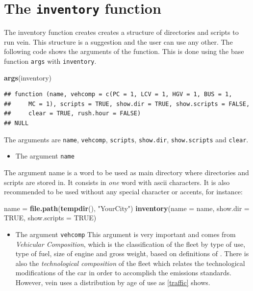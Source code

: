 \documentclass[12pt,graybox,envcountchap,sectrefs]{krantz}
\makeatletter
\newenvironment{Shaded}{\begin{snugshade}}{\end{snugshade}}
\newcommand{\KeywordTok}[1]{\textcolor[rgb]{0.13,0.29,0.53}{\textbf{#1}}}
\newcommand{\DataTypeTok}[1]{\textcolor[rgb]{0.13,0.29,0.53}{#1}}
\newcommand{\StringTok}[1]{\textcolor[rgb]{0.31,0.60,0.02}{#1}}
\newcommand{\OtherTok}[1]{\textcolor[rgb]{0.56,0.35,0.01}{#1}}
\newcommand{\NormalTok}[1]{#1}
\providecommand{\tightlist}{%
  \setlength{\itemsep}{0pt}\setlength{\parskip}{0pt}}
\newenvironment{kframe}{%
\medskip{}
\setlength{\fboxsep}{.8em}
 \def\at@end@of@kframe{}%
 \ifinner\ifhmode%
  \def\at@end@of@kframe{\end{minipage}}%
  \begin{minipage}{\columnwidth}%
 \fi\fi%
 \def\FrameCommand##1{\hskip\@totalleftmargin \hskip-\fboxsep
 \colorbox{shadecolor}{##1}\hskip-\fboxsep
     \hskip-\linewidth \hskip-\@totalleftmargin \hskip\columnwidth}%
 \MakeFramed {\advance\hsize-\width
   \@totalleftmargin\z@ \linewidth\hsize
   \@setminipage}}%
 {\par\unskip\endMakeFramed%
 \at@end@of@kframe}
\renewenvironment{Shaded}{\begin{kframe}}{\end{kframe}}
\theoremstyle{definition}
\theoremstyle{definition}
\theoremstyle{definition}
\theoremstyle{remark}
\makeatother
\begin{document}
\section{\texorpdfstring{The \texttt{inventory}
function}{The inventory function}}\label{the-inventory-function}

The inventory function creates creates a structure of directories and
scripts to run vein. This structure is a suggestion and the user can use
any other. The following code shows the arguments of the function. This
is done using the base function \texttt{args} with \texttt{inventory}.

\begin{Shaded}
\begin{Highlighting}[]
\KeywordTok{args}\NormalTok{(inventory)}
\end{Highlighting}
\end{Shaded}

\begin{verbatim}
## function (name, vehcomp = c(PC = 1, LCV = 1, HGV = 1, BUS = 1, 
##     MC = 1), scripts = TRUE, show.dir = TRUE, show.scripts = FALSE, 
##     clear = TRUE, rush.hour = FALSE) 
## NULL
\end{verbatim}

The arguments are \texttt{name}, \texttt{vehcomp}, \texttt{scripts},
\texttt{show.dir}, \texttt{show.scripts} and \texttt{clear}.

\begin{itemize}
\tightlist
\item
  The argument \texttt{name}
\end{itemize}

The argument name is a word to be used as main directory where
directories and scripts are stored in. It consists in \emph{one} word
with ascii characters. It is also recommended to be used without any
special character or accents, for instance:

\begin{Shaded}
\begin{Highlighting}[]
\NormalTok{name =}\StringTok{ }\KeywordTok{file.path}\NormalTok{(}\KeywordTok{tempdir}\NormalTok{(), }\StringTok{"YourCity"}\NormalTok{)}
\KeywordTok{inventory}\NormalTok{(}\DataTypeTok{name =}\NormalTok{ name, }\DataTypeTok{show.dir =} \OtherTok{TRUE}\NormalTok{, }\DataTypeTok{show.scripts =} \OtherTok{TRUE}\NormalTok{)}
\end{Highlighting}
\end{Shaded}

\begin{itemize}
\tightlist
\item
  The argument \texttt{vehcomp} This argument is very important and
  comes from \emph{Vehicular Composition}, which is the classification
  of the fleet by type of use, type of fuel, size of engine and gross
  weight, based on definitions of \citet{Corvalanetal2002}. There is
  also the \emph{technological composition} of the fleet which relates
  the technological modifications of the car in order to accomplish the
  emissions standards. However, vein uses a distribution by age of use
  as \ref{traffic} shows.
\end{itemize}
\end{document}
